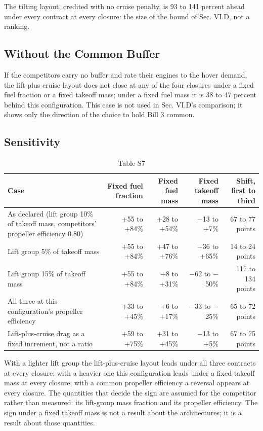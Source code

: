 \documentclass[journal]{new-aiaa}
\begin{document}
The tilting layout, credited with no cruise penalty, is 93 to 141 percent ahead under every contract at every closure: the size of the bound of Sec. VI.D, not a ranking.

\subsection*{Without the Common Buffer}

If the competitors carry no buffer and rate their engines to the hover demand, the lift-plus-cruise layout does not close at any of the four closures under a fixed fuel fraction or a fixed takeoff mass; under a fixed fuel mass it is 38 to 47 percent behind this configuration. This case is not used in Sec. VI.D's comparison; it shows only the direction of the choice to hold Bill 3 common.

\subsection*{Sensitivity}

\begin{table}[htbp]
\centering
\caption*{Table S7}
\small
\begin{tabularx}{\linewidth}{Xrrrr}
\hline
Case & Fixed fuel fraction & Fixed fuel mass & Fixed takeoff mass & Shift, first to third \\ \hline
As declared (lift group 10\% of takeoff mass, competitors' propeller efficiency 0.80) & +55 to +84\% & +28 to +54\% & $-$13 to +7\% & 67 to 77 points \\
Lift group 5\% of takeoff mass & +55 to +84\% & +47 to +76\% & +36 to +65\% & 14 to 24 points \\
Lift group 15\% of takeoff mass & +55 to +84\% & +8 to +31\% & $-$62 to $-$50\% & 117 to 134 points \\
All three at this configuration's propeller efficiency & +33 to +45\% & +6 to +17\% & $-$33 to $-$25\% & 65 to 72 points \\
Lift-plus-cruise drag as a fixed increment, not a ratio & +59 to +75\% & +31 to +45\% & $-$13 to +5\% & 67 to 75 points \\
\hline
\end{tabularx}
\end{table}

With a lighter lift group the lift-plus-cruise layout leads under all three contracts at every closure; with a heavier one this configuration leads under a fixed takeoff mass at every closure; with a common propeller efficiency a reversal appears at every closure. The quantities that decide the sign are assumed for the competitor rather than measured: its lift-group mass fraction and its propeller efficiency. The sign under a fixed takeoff mass is not a result about the architectures; it is a result about those quantities.
\end{document}

